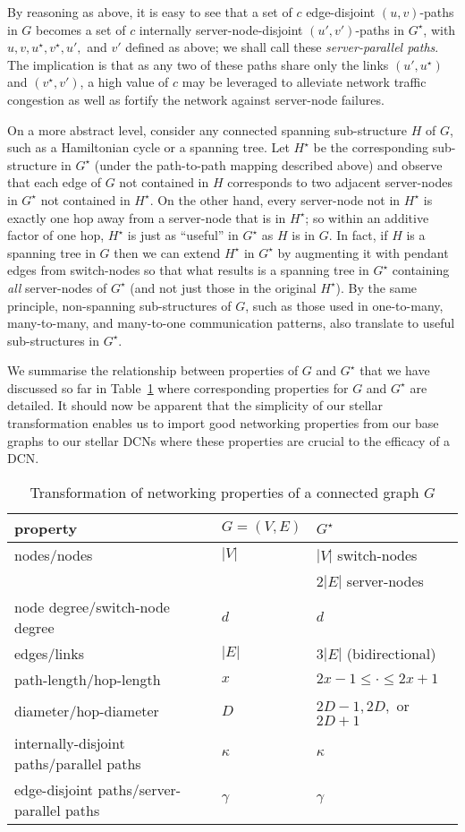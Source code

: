\documentclass[]{amsart}
\begin{document}
By reasoning as above, it is easy to see that a set of $c$ edge-disjoint
$(u,v)$-paths in $G$ becomes a set of $c$ internally
server-node-disjoint $(u',v')$-paths in $G^\star$, with
$u,v,u^\star,v^\star,u',$ and $v'$ defined as above; we shall call these
\emph{server-parallel paths}. The implication is that as any two of these
paths share only the links $(u',u^\star)$ and
$(v^\star,v')$, a high value of $c$ may be leveraged to alleviate
network traffic congestion as well as fortify the network against
server-node failures.


On a more abstract level, consider any connected spanning sub-structure
$H$ of $G$, such as a Hamiltonian cycle or a spanning tree.  Let
$H^\star$ be the corresponding sub-structure in $G^\star$ (under the path-to-path mapping described above) and observe
that each edge of $G$ not contained in $H$ corresponds to two adjacent
server-nodes in $G^\star$ not contained in $H^\star$.  On the other
hand, every server-node not in $H^\star$ is exactly one hop away from
a server-node that is in $H^\star$; so within an additive factor of
one hop, $H^\star$ is just as ``useful'' in $G^\star$ as $H$ is in
$G$. In fact, if $H$ is a spanning tree in $G$ then we can extend $H^\star$ in $G^\star$ by augmenting it with pendant edges from switch-nodes so that what results is a spanning tree in $G^\star$ containing \emph{all\/} server-nodes of $G^\star$ (and not just those in the original $H^\star$). By the same principle, non-spanning sub-structures of $G$, such
as those used in one-to-many, many-to-many, and many-to-one
communication patterns, also translate to useful sub-structures in $G^\star$.



We summarise the relationship between properties of $G$ and $G^\star$
that we have discussed so far in Table~\ref{tab:transformation} where corresponding properties for $G$ and $G^\star$ are detailed. It should now be apparent that the simplicity of our stellar transformation enables us to import good networking properties from our base graphs to our stellar DCNs where these properties are crucial to the efficacy of a DCN.

\begin{table}[ht]
  \centering
  \caption{Transformation of networking properties of a connected graph $G$}
  \label{tab:transformation}
  \begin{tabular}{lll}
    property&$G=(V,E)$&$G^\star$\\
    \hline
    nodes/nodes& $|V|$ & $|V|$ switch-nodes\\
&& $2|E|$ server-nodes\\
    node degree/switch-node degree & $d$& $d$\\  
    edges/links& $|E|$ & $3|E|$ (bidirectional)\\
    path-length/hop-length& $x$ & $2x-1\le\cdot \le 2x+1$\\
    diameter/hop-diameter& $D$ & $2D-1,2D,$ or $2D+1$\\
    internally-disjoint paths/parallel paths&$\kappa$ & $\kappa$\\
    edge-disjoint paths/server-parallel paths &$\gamma$  & $\gamma$
  \end{tabular}
\end{table}
\end{document}
